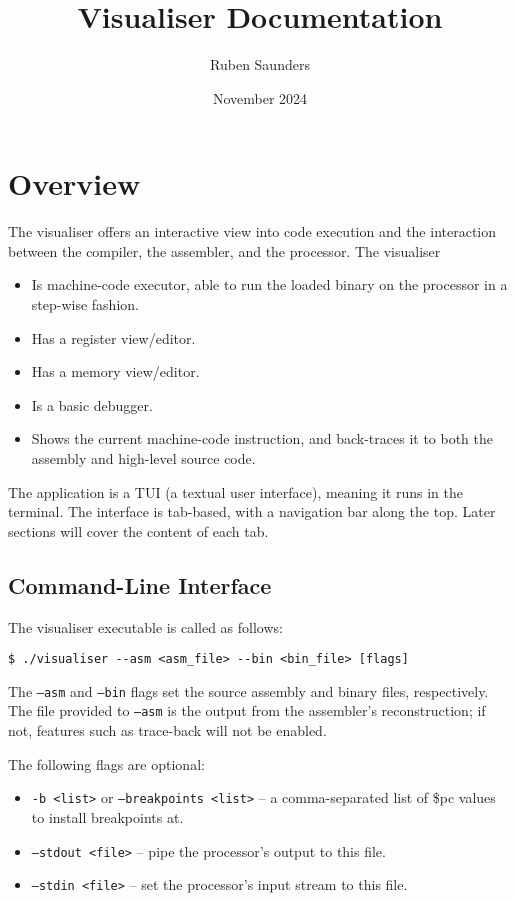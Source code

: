 \documentclass[10pt]{article}
\title{Visualiser Documentation}
\author{Ruben Saunders}
\date{November 2024}
\begin{document}
    \maketitle
    \tableofcontents

    \newpage

    \section{Overview}

    The visualiser offers an interactive view into code execution and the interaction between the compiler, the assembler, and the processor.
    The visualiser
    \begin{itemize}
        \item Is machine-code executor, able to run the loaded binary on the processor in a step-wise fashion.
        \item Has a register view/editor.
        \item Has a memory view/editor.
        \item Is a basic debugger.
        \item Shows the current machine-code instruction, and back-traces it to both the assembly and high-level source code.
    \end{itemize}

    The application is a TUI (a textual user interface), meaning it runs in the terminal.
    The interface is tab-based, with a navigation bar along the top.
    Later sections will cover the content of each tab.

    \subsection{Command-Line Interface}

    The visualiser executable is called as follows:

    \medskip
    \begin{lstlisting}[style=bashconsole]
$ ./visualiser --asm <asm_file> --bin <bin_file> [flags]
    \end{lstlisting}

    The \texttt{--asm} and \texttt{--bin} flags set the source assembly and binary files, respectively.
    The file provided to \texttt{--asm} is the output from the assembler's reconstruction; if not, features such as trace-back will not be enabled.

    The following flags are optional:
    \begin{itemize}
        \item \texttt{-b <list>} or \texttt{--breakpoints <list>} -- a comma-separated list of \$pc values to install breakpoints at.
        \item \texttt{--stdout <file>} -- pipe the processor's output to this file.
        \item \texttt{--stdin <file>} -- set the processor's input stream to this file.
    \end{itemize}
\end{document}
